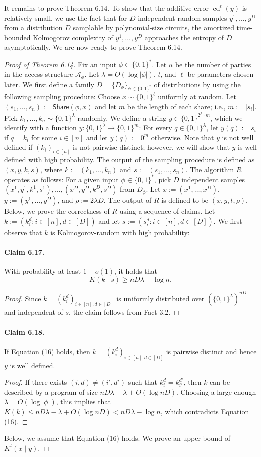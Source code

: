 \documentclass[10pt,a4paper]{article}
\begin{document}
It remains to prove Theorem 6.14. To show that the additive error $\operatorname{cd}^t(y)$ is relatively small, we use the fact that for $D$ independent random samples $y^1,\ldots,y^D$ from a distribution $D$ samplable by polynomial-size circuits, the amortized time-bounded Kolmogorov complexity of $y^1,\ldots,y^D$ approaches the entropy of $D$ asymptotically.
We are now ready to prove Theorem 6.14.
\begin{proof}[Proof of Theorem 6.14]
Fix an input $\phi\in\{0,1\}^*$. Let $n$ be the number of parties in the access structure $\mathcal A_\phi$. Let $\lambda=O(\log|\phi|)$, $t$, and $\ell$ be parameters chosen later.
We first define a family $D=\{D_\phi\}_{\phi\in\{0,1\}^*}$ of distributions by using the following sampling procedure: Choose $x\sim\{0,1\}^\ell$ uniformly at random. Let $(s_1,\ldots,s_n):=\mathsf{Share}(\phi,x)$ and let $m$ be the length of each share; i.e., $m:=|s_i|$. Pick $k_1,\ldots,k_n\sim\{0,1\}^\lambda$ randomly. We define a string $y\in\{0,1\}^{2^\lambda\cdot m}$, which we identify with a function $y:\{0,1\}^\lambda\to\{0,1\}^m$: For every $q\in\{0,1\}^\lambda$, let $y(q):=s_i$ if $q=k_i$ for some $i\in[n]$ and let $y(q):=0^m$ otherwise. Note that $y$ is not well defined if $(k_i)_{i\in[n]}$ is not pairwise distinct; however, we will show that $y$ is well defined with high probability. The output of the sampling procedure is defined as $(x,y,k,s)$, where $k:=(k_1,\ldots,k_n)$ and $s:=(s_1,\ldots,s_n)$.
The algorithm $R$ operates as follows: For a given input $\phi\in\{0,1\}^*$, pick $D$ independent samples $(x^1,y^1,k^1,s^1),\ldots,(x^D,y^D,k^D,s^D)$ from $D_\phi$. Let $x:=(x^1,\ldots,x^D)$, $y:=(y^1,\ldots,y^D)$, and $\rho:=2\lambda D$. The output of $R$ is defined to be $(x,y,t,\rho)$.
Below, we prove the correctness of $R$ using a sequence of claims. Let $k:=(k_i^d:i\in[n],d\in[D])$ and let $s:=(s_i^d:i\in[n],d\in[D])$. We first observe that $k$ is Kolmogorov-random with high probability:
\paragraph{Claim 6.17.}
With probability at least $1-o(1)$, it holds that
\[K(k\mid s)\geq nD\lambda-\log n.\tag{16}\]
\begin{proof}
Since $k=(k_i^d)_{i\in[n],d\in[D]}$ is uniformly distributed over $(\{0,1\}^\lambda)^{nD}$ and independent of $s$, the claim follows from Fact 3.2.
\end{proof}
\paragraph{Claim 6.18.}
If Equation (16) holds, then $k=(k_i^d)_{i\in[n],d\in[D]}$ is pairwise distinct and hence $y$ is well defined.
\begin{proof}
If there exists $(i,d)\neq(i',d')$ such that $k_i^d=k_{i'}^{d'}$, then $k$ can be described by a program of size $nD\lambda-\lambda+O(\log nD)$. Choosing a large enough $\lambda=O(\log|\phi|)$, this implies that $K(k)\leq nD\lambda-\lambda+O(\log nD)<nD\lambda-\log n$, which contradicts Equation (16).
\end{proof}
Below, we assume that Equation (16) holds. We prove an upper bound of $K^t(x\mid y)$.

\end{proof}
\end{document}
